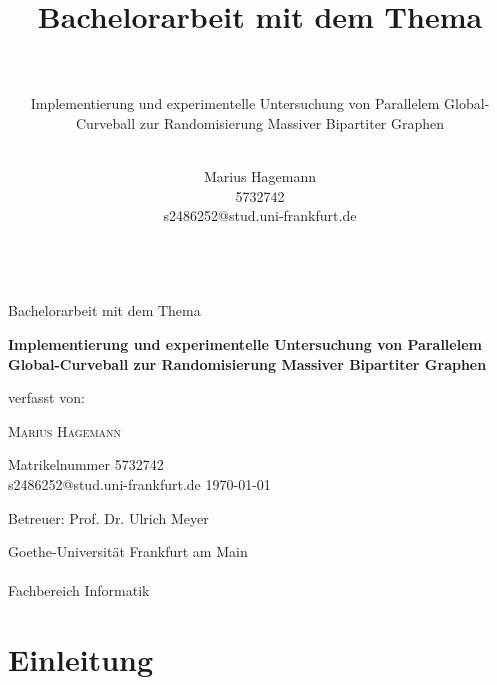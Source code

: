 \documentclass[a4paper]{scrreprt}
\title{Bachelorarbeit mit dem Thema \\ ~}
\subtitle{ Implementierung und experimentelle Untersuchung von Parallelem Global-Curveball zur Randomisierung
Massiver Bipartiter Graphen\\ ~}
\author{Marius Hagemann \\ 5732742 \\ s2486252@stud.uni-frankfurt.de \\~}
\theoremstyle{plain} %
\theoremstyle{definition} %
\begin{document}
\begin{titlepage}
	\centering
	{\LARGE Bachelorarbeit mit dem Thema\par}
	\vfill
	{\huge\bfseries Implementierung und experimentelle Untersuchung von Parallelem Global-Curveball zur Randomisierung
Massiver Bipartiter Graphen\par}
	\vspace{2.5cm}
	{\Large verfasst von: \par}
	\vspace{1cm}
	{\LARGE \scshape Marius Hagemann\par}
	\vspace{0.5cm}
	{\large Matrikelnummer 5732742 \\ s2486252@stud.uni-frankfurt.de}
	\vfill
	{\Large \today}
	\vfill
	{\LARGE Betreuer: Prof. Dr. Ulrich Meyer\par}
	\vspace{1.5cm}
	{\LARGE Goethe-Universität Frankfurt am Main \\ ~\\ Fachbereich Informatik}
\end{titlepage}




\cleardoublepage 



\newpage

\tableofcontents



\chapter{Einleitung}
\end{document}
